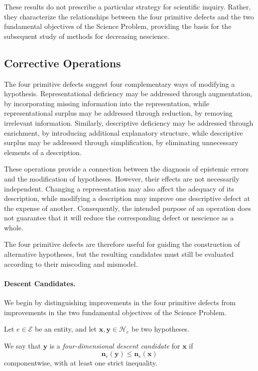 These results do not prescribe a particular strategy for scientific inquiry. Rather, they characterize the relationships between the four primitive defects and the two fundamental objectives of the Science Problem, providing the basis for the subsequent study of methods for decreasing nescience.


\subsection*{Corrective Operations}
\label{sec:corrective_operations}

The four primitive defects suggest four complementary ways of
modifying a hypothesis. Representational deficiency may be
addressed through augmentation, by incorporating missing
information into the representation, while representational
surplus may be addressed through reduction, by removing
irrelevant information. Similarly, descriptive deficiency
may be addressed through enrichment, by introducing additional
explanatory structure, while descriptive surplus may be
addressed through simplification, by eliminating unnecessary
elements of a description.

These operations provide a connection between the diagnosis
of epistemic errors and the modification of hypotheses.
However, their effects are not necessarily independent.
Changing a representation may also affect the adequacy of
its description, while modifying a description may improve
one descriptive defect at the expense of another. Consequently,
the intended purpose of an operation does not guarantee
that it will reduce the corresponding defect or nescience
as a whole.

The four primitive defects are therefore useful for guiding
the construction of alternative hypotheses, but the resulting
candidates must still be evaluated according to their
miscoding and mismodel.

\paragraph{Descent Candidates.}

We begin by distinguishing improvements in the four
primitive defects from improvements in the two fundamental
objectives of the Science Problem.

\begin{definition}
Let $e\in\mathcal E$ be an entity, and let
$\mathbf{x},\mathbf{y}\in\mathcal H_e$ be two hypotheses.

We say that $\mathbf{y}$ is a
\emph{four-dimensional descent candidate}
for $\mathbf{x}$ if
\[
\mathbf n_e(\mathbf{y})
\leq
\mathbf n_e(\mathbf{x})
\]
componentwise, with at least one strict inequality.
\end{definition}

